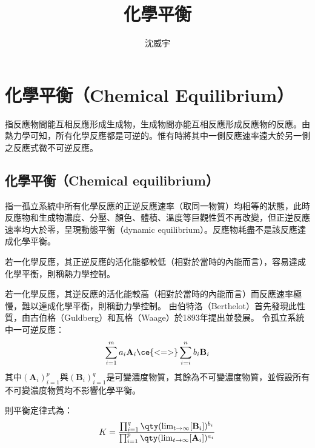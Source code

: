 \documentclass[a4paper,12pt]{article}
\begin{document}
\title{化學平衡}
\author{沈威宇}
\date{\temtoday}
\titletocdoc
\section{化學平衡（Chemical Equilibrium）}
指反應物間能互相反應形成生成物，生成物間亦能互相反應形成反應物的反應。由熱力學可知，所有化學反應都是可逆的。惟有時將其中一側反應速率遠大於另一側之反應式微不可逆反應。
\subsection{化學平衡（Chemical equilibrium）}
指一孤立系統中所有化學反應的正逆反應速率（取同一物質）均相等的狀態，此時反應物和生成物濃度、分壓、顏色、體積、溫度等巨觀性質不再改變，但正逆反應速率均大於零，呈現動態平衡（dynamic equilibrium）。反應物耗盡不是該反應達成化學平衡。
\bit
\item 若一化學反應，其正逆反應的活化能都較低（相對於當時的內能而言），容易達成化學平衡，則稱熱力學控制。
\item 若一化學反應，其逆反應的活化能較高（相對於當時的內能而言）而反應速率極慢，難以達成化學平衡，則稱動力學控制。
\eit
{}
由伯特洛（Berthelot）首先發現此性質，由古伯格（Guldberg）和瓦格（Waage）於1893年提出並發展。
令孤立系統中一可逆反應：
\[\sum_{i=1}^ma_i\mathbf{A}_i\ce{<=>}\sum_{i=i}^nb_i\mathbf{B}_i\]
其中$(\mathbf{A}_i)_{i=1}^p$與$(\mathbf{B}_i)_{i=1}^q$是可變濃度物質，其餘為不可變濃度物質，並假設所有不可變濃度物質均不影響化學平衡。

則平衡定律式為：
\[K=\frac{\prod_{i=1}^q\qty(\lim_{t\to\infty}[\mathbf{B}_i])^{b_i}}{\prod_{i=1}^p\qty(\lim_{t\to\infty}[\mathbf{A}_i])^{a_i}}\]
\end{document}
